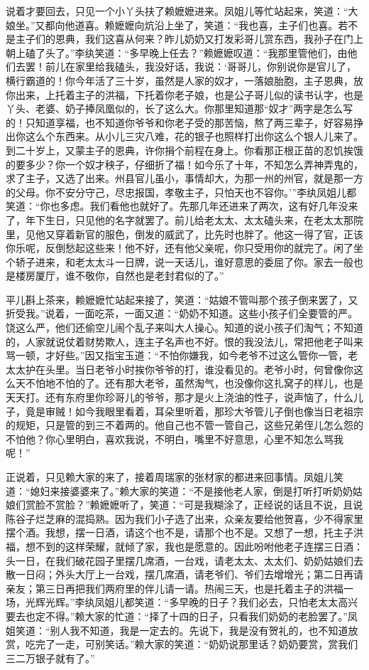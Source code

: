 说着才要回去，只见一个小丫头扶了赖嬷嬷进来。凤姐儿等忙站起来，笑道：``大娘坐。''又都向他道喜。赖嬷嬷向炕沿上坐了，笑道：``我也喜，主子们也喜。若不是主子们的恩典，我们这喜从何来？昨儿奶奶又打发彩哥儿赏东西，我孙子在门上朝上磕了头了。''李纨笑道：``多早晚上任去？''赖嬷嬷叹道：``我那里管他们，由他们去罢！前儿在家里给我磕头，我没好话，我说：`哥哥儿，你别说你是官儿了，横行霸道的！你今年活了三十岁，虽然是人家的奴才，一落娘胎胞，主子恩典，放你出来，上托着主子的洪福，下托着你老子娘，也是公子哥儿似的读书认字，也是丫头、老婆、奶子捧凤凰似的，长了这么大。你那里知道那``奴才''两字是怎么写的！只知道享福，也不知道你爷爷和你老子受的那苦恼，熬了两三辈子，好容易挣出你这么个东西来。从小儿三灾八难，花的银子也照样打出你这么个银人儿来了。到二十岁上，又蒙主子的恩典，许你捐个前程在身上。你看那正根正苗的忍饥挨饿的要多少？你一个奴才秧子，仔细折了福！如今乐了十年，不知怎么弄神弄鬼的，求了主子，又选了出来。州县官儿虽小，事情却大，为那一州的州官，就是那一方的父母。你不安分守己，尽忠报国，孝敬主子，只怕天也不容你。'''李纨凤姐儿都笑道：``你也多虑。我们看他也就好了。先那几年还进来了两次，这有好几年没来了，年下生日，只见他的名字就罢了。前儿给老太太、太太磕头来，在老太太那院里，见他又穿着新官的服色，倒发的威武了，比先时也胖了。他这一得了官，正该你乐呢，反倒愁起这些来！他不好，还有他父亲呢，你只受用你的就完了。闲了坐个轿子进来，和老太太斗一日牌，说一天话儿，谁好意思的委屈了你。家去一般也是楼房厦厅，谁不敬你，自然也是老封君似的了。''

平儿斟上茶来，赖嬷嬷忙站起来接了，笑道：``姑娘不管叫那个孩子倒来罢了，又折受我。''说着，一面吃茶，一面又道：``奶奶不知道。这些小孩子们全要管的严。饶这么严，他们还偷空儿闹个乱子来叫大人操心。知道的说小孩子们淘气；不知道的，人家就说仗着财势欺人，连主子名声也不好。恨的我没法儿，常把他老子叫来骂一顿，才好些。''因又指宝玉道：``不怕你嫌我，如今老爷不过这么管你一管，老太太护在头里。当日老爷小时挨你爷爷的打，谁没看见的。老爷小时，何曾像你这么天不怕地不怕的了。还有那大老爷，虽然淘气，也没像你这扎窝子的样儿，也是天天打。还有东府里你珍哥儿的爷爷，那才是火上浇油的性子，说声恼了，什么儿子，竟是审贼！如今我眼里看着，耳朵里听着，那珍大爷管儿子倒也像当日老祖宗的规矩，只是管的到三不着两的。他自己也不管一管自己，这些兄弟侄儿怎么怨的不怕他？你心里明白，喜欢我说，不明白，嘴里不好意思，心里不知怎么骂我呢！''

正说着，只见赖大家的来了，接着周瑞家的张材家的都进来回事情。凤姐儿笑道：``媳妇来接婆婆来了。''赖大家的笑道：``不是接他老人家，倒是打听打听奶奶姑娘们赏脸不赏脸？''赖嬷嬷听了，笑道：``可是我糊涂了，正经说的话且不说，且说陈谷子烂芝麻的混捣熟。因为我们小子选了出来，众亲友要给他贺喜，少不得家里摆个酒。我想，摆一日酒，请这个也不是，请那个也不是。又想了一想，托主子洪福，想不到的这样荣耀，就倾了家，我也是愿意的。因此吩咐他老子连摆三日酒：头一日，在我们破花园子里摆几席酒，一台戏，请老太太、太太们、奶奶姑娘们去散一日闷；外头大厅上一台戏，摆几席酒，请老爷们、爷们去增增光；第二日再请亲友；第三日再把我们两府里的伴儿请一请。热闹三天，也是托着主子的洪福一场，光辉光辉。''李纨凤姐儿都笑道：``多早晚的日子？我们必去，只怕老太太高兴要去也定不得。''赖大家的忙道：``择了十四的日子，只看我们奶奶的老脸罢了。''凤姐笑道：``别人我不知道，我是一定去的。先说下，我是没有贺礼的，也不知道放赏，吃完了一走，可别笑话。''赖大家的笑道：``奶奶说那里话？奶奶要赏，赏我们三二万银子就有了。''

